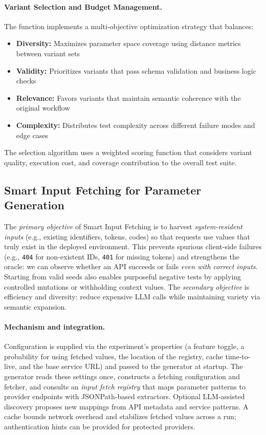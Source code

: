 \documentclass[conference]{IEEEtran}
\begin{document}
\paragraph{Variant Selection and Budget Management.}
The  function implements a multi-objective
optimization strategy that balances:

\begin{itemize}[leftmargin=*]
  \item \textbf{Diversity:} Maximizes parameter space coverage using
        distance metrics between variant sets
  \item \textbf{Validity:} Prioritizes variants that pass schema
        validation and business logic checks
  \item \textbf{Relevance:} Favors variants that maintain semantic
        coherence with the original workflow
  \item \textbf{Complexity:} Distributes test complexity across
        different failure modes and edge cases
\end{itemize}

The selection algorithm uses a weighted scoring function that considers
variant quality, execution cost, and coverage contribution to the overall
test suite.


\subsection{Smart Input Fetching for Parameter Generation}\label{ssec:smartfetch}

The \emph{primary objective} of Smart Input Fetching is to harvest \emph{system-resident inputs} (e.g., existing identifiers, tokens, codes) so that requests use values that truly exist in the deployed environment. This prevents spurious client-side failures (e.g., \texttt{404} for non-existent IDs, \texttt{401} for missing tokens) and strengthens the oracle: we can observe whether an API succeeds or fails \emph{even with correct inputs}. Starting from valid seeds also enables purposeful negative tests by applying controlled mutations or withholding context values. The \emph{secondary objective} is efficiency and diversity: reduce expensive LLM calls while maintaining variety via semantic expansion.

\paragraph{Mechanism and integration.}
Configuration is supplied via the experiment’s properties (a feature toggle, a probability for using fetched values, the location of the registry, cache time-to-live, and the base service URL) and passed to the generator at startup. The generator reads these settings once, constructs a fetching configuration and fetcher, and consults an \emph{input fetch registry} that maps parameter patterns to provider endpoints with JSONPath-based extractors. Optional LLM-assisted discovery proposes new mappings from API metadata and service patterns. A cache bounds network overhead and stabilizes fetched values across a run; authentication hints can be provided for protected providers.
\end{document}

